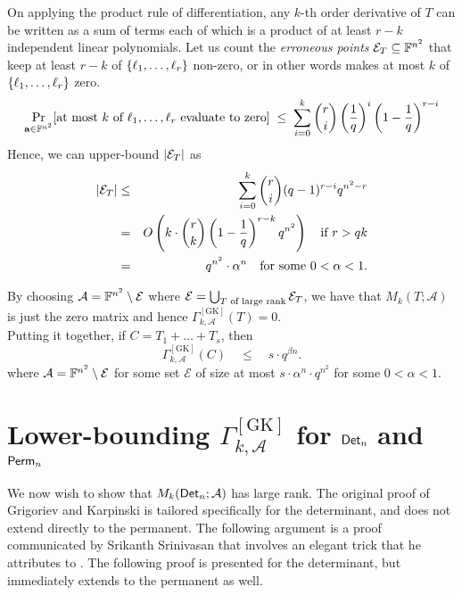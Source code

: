 \documentclass[12pt]{report}
\newcommand{\CM}[1]{\Gamma^{\mathrm{[#1]}}}
\begin{document}
On applying the product rule of differentiation, any $k$-th order 
derivative of $T$ can be written as a sum of terms each of which 
is a product of at least $r-k$ independent linear polynomials. Let us count the
\emph{erroneous points} $\mathcal{E}_T\subseteq \mathbb{F}^{n^2}$ that keep at
least $r-k$ of $\left\{\ell_1,\dots, \ell_r\right\}$ non-zero, or in other
words makes at most $k$ of $\left\{\ell_1,\dots, \ell_r\right\}$ zero.
$$
\Pr_{\mathbf{a}\in \mathbb{F}^{n^2}}[\text{at most $k$ of $\ell_1,\dots,
  \ell_r$ evaluate to zero}] \;\leq \; \sum_{i=0}^k \binom{r}{i} \left(\frac{1}{q}\right)^i\left(1 - \frac{1}{q}\right)^{r-i}
$$
Hence, we can upper-bound $\left|\mathcal{E}_T\right|$ as
\begin{eqnarray*}
\left|\mathcal{E}_T\right| &\leq & \sum_{i=0}^k \binom{r}{i} (q-1)^{r-i}q^{n^2 - r}\\
 & = & O\left(k\cdot \binom{r}{k}\left(1 - \frac{1}{q}\right)^{r-k} q^{n^2}\right) \quad\text{if $r > qk$}\\
 & = & q^{n^2} \cdot \alpha^n\quad\text{for some $0< \alpha < 1$}.
 \end{eqnarray*}

 By choosing $\mathcal{A} = \mathbb{F}^{n^2} \setminus \mathcal{E}$ where
 $\mathcal{E} = \bigcup_{\text{$T$ of large rank}} \mathcal{E}_T$, we
 have that $M_k(T;\mathcal{A})$ is just the zero matrix and hence
 $\CM{GK}_{k,\mathcal{A}}(T) = 0$.\\


Putting it together, if $C = T_1 + \dots + T_s$, then 
\begin{equation}\label{eqn:gk-upper-bound-circuit}
\CM{GK}_{k,\mathcal{A}}(C) \quad \leq \quad s \cdot
q^{\beta n}.
\end{equation} 
where $\mathcal{A} = \mathbb{F}^{n^2} \setminus \mathcal{E}$ for some set
$\mathcal{E}$ of size at most $s \cdot \alpha^n \cdot q^{n^2}$ for
some $0< \alpha < 1$.

\section{Lower-bounding $\CM{GK}_{k,\mathcal{A}}$ for $\mathsf{Det}_n$ and $\mathsf{Perm}_n$}

We now wish to show that $M_k(\mathsf{Det}_n;\mathcal{A})$ has large rank. The original proof of Grigoriev and Karpinski is tailored specifically for the determinant, and does not extend directly to the permanent. The following argument is a proof communicated by Srikanth Srinivasan \cite{Srikanth13} that involves an elegant trick that he attributes to \cite{Koutis08}. The following proof is presented for the determinant, but immediately extends to the permanent as well. \\
\end{document}
